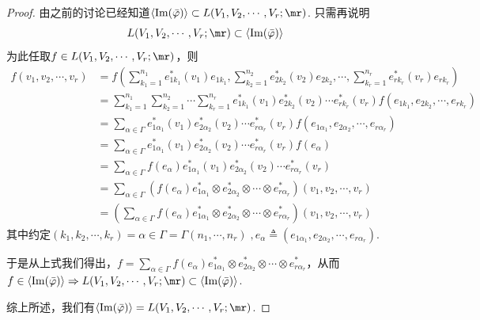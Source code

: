 \begin{proof}
	由之前的讨论已经知道$\langle\operatorname{Im}(\bar{\varphi}) \rangle\subset L(V_{1}, V_{2},\cdots ,V_{r};\mr)$. 只需再说明
	\[
		L(V_{1}, V_{2},\cdots ,V_{r};\mr)\subset \langle\operatorname{Im}(\bar{\varphi}) \rangle
	\]
	为此任取$f\in L(V_{1},V_{2},\cdots,V_{r};\mr)$，则
	\begin{equation}
	\begin{split}
	f(v_{1},v_{2},\cdots,v_{r})&=f\left(\sum_{k_{1}=1}^{n_{1}}e^{\ast}_{1k_{1}}(v_{1})e_{1k_{1}},\sum_{k_{2}=1}^{n_{2}}e^{\ast}_{2k_{2}}(v_{2})e_{2k_{2}},\cdots,\sum_{k_{r}=1}^{n_{r}}e^{\ast}_{rk_{r}}(v_{r})e_{rk_{r}}\right)\\
	&=\sum_{k_{1}=1}^{n_{1}}\sum_{k_{2}=1}^{n_{2}}\cdots\sum_{k_{r}=1}^{n_{r}}e^{\ast}_{1k_{1}}(v_{1})e^{\ast}_{2k_{2}}(v_{2})\cdots e^{\ast}_{rk_{r}}(v_{r})f\left(e_{1k_{1}},e_{2k_{2}},\cdots,e_{rk_{r}} \right)\\
	&=\sum_{ \alpha\in \Gamma }e^{\ast}_{1\alpha_{1}}(v_{1})e^{\ast}_{2\alpha_{2}}(v_{2})\cdots e^{\ast}_{r\alpha_{r}}(v_{r})f\left(e_{1\alpha_{1}},e_{2\alpha_{2}},\cdots,e_{r\alpha_{r}} \right)\\
	&=\sum_{ \alpha\in \Gamma }e^{\ast}_{1\alpha_{1}}(v_{1})e^{\ast}_{2\alpha_{2}}(v_{2})\cdots e^{\ast}_{r\alpha_{r}}(v_{r})f(e_{\alpha})\\
	&=\sum_{ \alpha\in \Gamma }f(e_{\alpha})e^{\ast}_{1\alpha_{1}}(v_{1})e^{\ast}_{2\alpha_{2}}(v_{2})\cdots e^{\ast}_{r\alpha_{r}}(v_{r})\\
	&=\sum_{ \alpha\in \Gamma }\left(f(e_{\alpha})e^{\ast}_{1\alpha_{1}}\otimes e^{\ast}_{2\alpha_{2}}\otimes \cdots \otimes e^{\ast}_{r\alpha_{r}}\right)(v_{1},v_{2},\cdots,v_{r})\\
	&=\left(\sum_{ \alpha\in \Gamma }f(e_{\alpha})e^{\ast}_{1\alpha_{1}}\otimes e^{\ast}_{2\alpha_{2}}\otimes \cdots \otimes e^{\ast}_{r\alpha_{r}}\right)(v_{1},v_{2},\cdots,v_{r})
	\end{split}
	\end{equation}
	其中约定$(k_{1},k_{2},\cdots,k_{r})=\alpha\in \Gamma=\Gamma(n_{1},\cdots,n_{r})\;,e_{\alpha}\triangleq \left(e_{1\alpha_{1}},e_{2\alpha_{2}},\cdots,e_{r\alpha_{r}} \right)$. 
	
	于是从上式我们得出，$f=\sum_{ \alpha\in \Gamma }f(e_{\alpha})e^{\ast}_{1\alpha_{1}}\otimes e^{\ast}_{2\alpha_{2}}\otimes \cdots \otimes e^{\ast}_{r\alpha_{r}}$，从而$f\in \langle\operatorname{Im}(\bar{\varphi}) \rangle\Rightarrow L(V_{1}, V_{2},\cdots ,V_{r};\mr)\subset \langle\operatorname{Im}(\bar{\varphi}) \rangle$.
	
	综上所述，我们有$\langle\operatorname{Im}(\bar{\varphi}) \rangle=L(V_{1}, V_{2},\cdots ,V_{r};\mr)$.
\end{proof}

